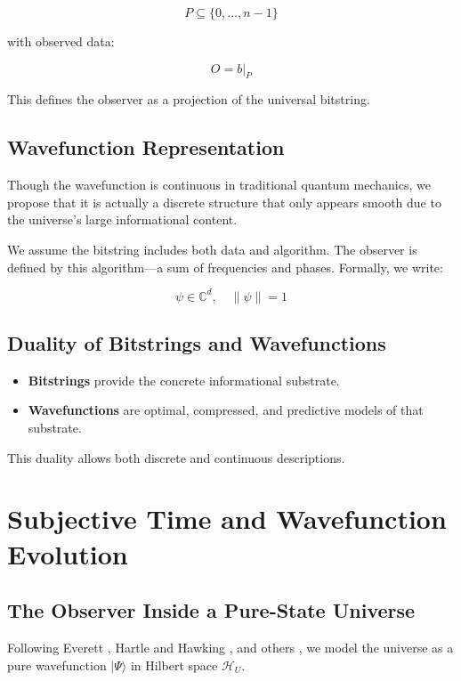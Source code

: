 \documentclass[11pt]{article}
\begin{document}
\[
      P \subseteq \{0, \dots, n-1\}
\]

with observed data:

\[
      O = b|_P
\]

This defines the observer as a projection of the universal bitstring.

\subsection{Wavefunction Representation}

Though the wavefunction is continuous in traditional quantum mechanics, we propose that it is actually a discrete structure that only appears smooth due to the universe’s large informational content.

We assume the bitstring includes both data and algorithm. The observer is defined by this algorithm—a sum of frequencies and phases. Formally, we write:

\[
      \psi \in \mathbb{C}^d,\quad \|\psi\| = 1
\]

\subsection{Duality of Bitstrings and Wavefunctions}

\begin{itemize}
      \item \textbf{Bitstrings} provide the concrete informational substrate.
      \item \textbf{Wavefunctions} are optimal, compressed, and predictive models of that substrate.
\end{itemize}

This duality allows both discrete and continuous descriptions.

\section{Subjective Time and Wavefunction Evolution}

\subsection*{The Observer Inside a Pure-State Universe}

Following Everett \cite{everett1957relative}, Hartle and Hawking \cite{hartle1983wave}, and others \cite{maldacena1998largeN, witten1998ads, rovelli1997loop}, we model the universe as a pure wavefunction \(|\Psi\rangle\) in Hilbert space \(\mathcal{H}_U\).
\end{document}
